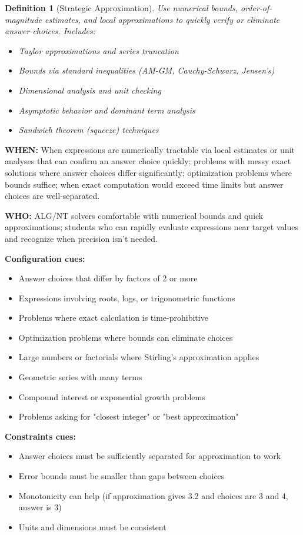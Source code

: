 \documentclass[12pt]{article}
\newtheorem{definition}{Definition}[section]
\begin{document}
\begin{definition}[Strategic Approximation]
Use numerical bounds, order-of-magnitude estimates, and local approximations to quickly verify or eliminate answer choices. Includes:
\begin{itemize}
    \item Taylor approximations and series truncation
    \item Bounds via standard inequalities (AM-GM, Cauchy-Schwarz, Jensen's)
    \item Dimensional analysis and unit checking
    \item Asymptotic behavior and dominant term analysis
    \item Sandwich theorem (squeeze) techniques
\end{itemize}
\end{definition}

\textbf{WHEN:} When expressions are numerically tractable via local estimates or unit analyses that can confirm an answer choice quickly; problems with messy exact solutions where answer choices differ significantly; optimization problems where bounds suffice; when exact computation would exceed time limits but answer choices are well-separated.

\textbf{WHO:} ALG/NT solvers comfortable with numerical bounds and quick approximations; students who can rapidly evaluate expressions near target values and recognize when precision isn't needed.

\textbf{Configuration cues:}
\begin{itemize}
    \item Answer choices that differ by factors of 2 or more
    \item Expressions involving roots, logs, or trigonometric functions
    \item Problems where exact calculation is time-prohibitive
    \item Optimization problems where bounds can eliminate choices
    \item Large numbers or factorials where Stirling's approximation applies
    \item Geometric series with many terms
    \item Compound interest or exponential growth problems
    \item Problems asking for "closest integer" or "best approximation"
\end{itemize}

\textbf{Constraints cues:}
\begin{itemize}
    \item Answer choices must be sufficiently separated for approximation to work
    \item Error bounds must be smaller than gaps between choices
    \item Monotonicity can help (if approximation gives 3.2 and choices are 3 and 4, answer is 3)
    \item Units and dimensions must be consistent
\end{itemize}
\end{document}
